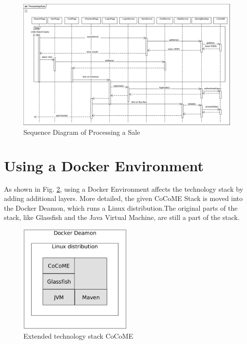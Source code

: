 \begin{figure}[!h]
	\includegraphics[width=\textwidth]{img/appProcessSale.png}
	\caption{Sequence Diagram of Processing a Sale}
	\label{SequenceAppSale}
\end{figure}

\newpage

\section{Using a Docker Environment} \label{Docker}

As shown in Fig. \ref{techStack}, using a Docker Environment affects the technology stack by adding additional layers. More detailed, the given CoCoME Stack is moved into the Docker Deamon, which runs a Linux distribution.The original parts of the stack, like Glassfish and the Java Virtual Machine, are still a part of the stack.
	
	\begin{figure}[!h]
		\centering
		\includegraphics[width = 0.5\textwidth]{img/tech_stack_CoCoME.png}
		\caption{Extended technology stack CoCoME}
		\label{techStack}
	\end{figure}
	
